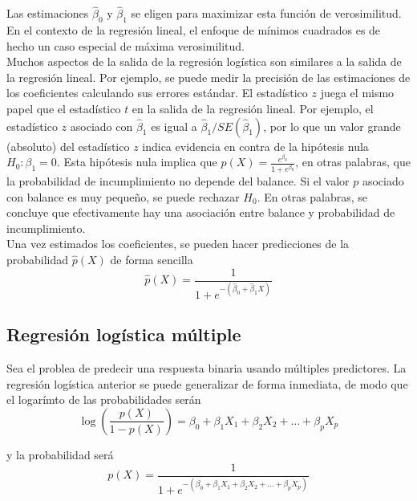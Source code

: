 Las estimaciones $\hat{\beta}_0$ y $\hat{\beta}_1$ se eligen para maximizar esta función de verosimilitud. En el contexto de la regresión lineal, el enfoque de mínimos cuadrados es de hecho un caso especial de máxima verosimilitud. \\

Muchos aspectos de la salida de la regresión logística son similares a la salida de la regresión lineal. Por ejemplo, se puede medir la precisión de las estimaciones de los coeficientes calculando sus errores estándar. El estadístico $z$ juega el mismo papel que el estadístico $t$ en la salida de la regresión lineal. Por ejemplo, el estadístico $z$ asociado con $\hat{\beta}_1$ es igual a $\hat{\beta}_1 / SE(\hat{\beta}_1)$, por lo que un valor grande (absoluto) del estadístico $z$ indica evidencia en contra de la hipótesis nula $H_0: \beta_1 = 0$. Esta hipótesis nula implica que $p(X) = \frac{e^{\beta_0}}{1 + e^{\beta_0}}$, en otras palabras, que la probabilidad de incumplimiento no depende del balance. Si el valor $p$ asociado con balance es muy pequeño, se puede rechazar $H_0$. En otras palabras, se concluye que efectivamente hay una asociación entre balance y probabilidad de incumplimiento. \\

Una vez estimados los coeficientes, se pueden hacer predicciones de la probabilidad $\hat{p}(X)$ de forma sencilla 
\begin{equation}
\hat{p}(X) = \frac{1}{1 + e^{-(\hat{\beta}_0 + \hat{\beta}_1 X)}}
\label{eq:4.5.1}
\end{equation}

\subsection{Regresión logística múltiple}

Sea el problea de predecir una respuesta binaria usando múltiples predictores. La regresión logística anterior se puede generalizar de forma inmediata, de modo que el logarímto de las probabilidades serán
\begin{equation}
\log\left(\frac{p(X)}{1 - p(X)}\right) = \beta_0 + \beta_1 X_1 + \beta_2 X_2 + \dots + \beta_p X_p
\label{eq:4.6}
\end{equation}

\noindent y la probabilidad será 
\begin{equation}
p(X) = \frac{1}{1 + e^{-(\beta_0 + \beta_1 X_1 + \beta_2 X_2 + \dots + \beta_p X_p)}}
\label{eq:4.7}
\end{equation}

